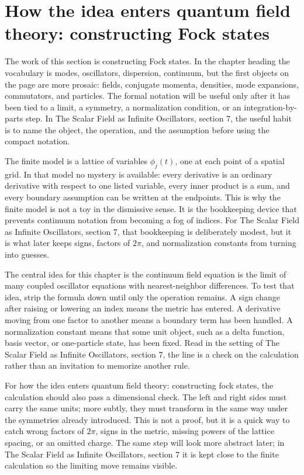 \section{How the idea enters quantum field theory: constructing Fock states}

The work of this section is constructing Fock states.  In the chapter heading the vocabulary is modes, oscillators, dispersion, continuum, but the first objects on the page are more prosaic: fields, conjugate momenta, densities, mode expansions, commutators, and particles.  The formal notation will be useful only after it has been tied to a limit, a symmetry, a normalization condition, or an integration-by-parts step.  In The Scalar Field as Infinite Oscillators, section 7, the useful habit is to name the object, the operation, and the assumption before using the compact notation.

The finite model is a lattice of variables \(\phi_j(t)\), one at each point of a spatial grid.  In that model no mystery is available: every derivative is an ordinary derivative with respect to one listed variable, every inner product is a sum, and every boundary assumption can be written at the endpoints.  This is why the finite model is not a toy in the dismissive sense.  It is the bookkeeping device that prevents continuum notation from becoming a fog of indices.  For The Scalar Field as Infinite Oscillators, section 7, that bookkeeping is deliberately modest, but it is what later keeps signs, factors of \(2\pi\), and normalization constants from turning into guesses.

The central idea for this chapter is the continuum field equation is the limit of many coupled oscillator equations with nearest-neighbor differences.  To test that idea, strip the formula down until only the operation remains.  A sign change after raising or lowering an index means the metric has entered.  A derivative moving from one factor to another means a boundary term has been handled.  A normalization constant means that some unit object, such as a delta function, basis vector, or one-particle state, has been fixed.  Read in the setting of The Scalar Field as Infinite Oscillators, section 7, the line is a check on the calculation rather than an invitation to memorize another rule.

For how the idea enters quantum field theory: constructing fock states, the calculation should also pass a dimensional check.  The left and right sides must carry the same units; more subtly, they must transform in the same way under the symmetries already introduced.  This is not a proof, but it is a quick way to catch wrong factors of \(2\pi\), signs in the metric, missing powers of the lattice spacing, or an omitted charge.  The same step will look more abstract later; in The Scalar Field as Infinite Oscillators, section 7 it is kept close to the finite calculation so the limiting move remains visible.

